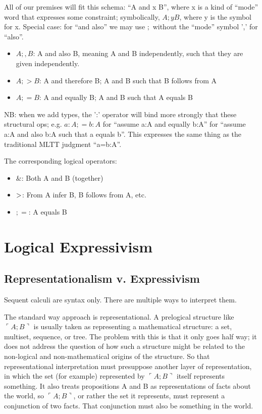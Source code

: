 \documentclass{article}
\begin{document}
All of our premises will fit this schema: ``A and x B'', where x is a
kind of ``mode'' word that expresses some constraint; symbolically,
\(A ;y B\), where y is the symbol for x. Special case: for ``and
also'' we may use \(;\) without the ``mode'' symbol ',' for ``also''.

\begin{itemize}
\item \(A ;, B\): A and also B, meaning A and B independently, such that they are given independently.
\item \(A ;> B\): A and therefore B; A and B such that B follows from A
\item \(A ;= B\): A and equally B; A and B such that A equals B
\end{itemize}

NB: when we add types, the ':' operator will bind more strongly that
these structural ops; e.g. \(a:A ;= b:A\) for ``assume a:A and equally
b:A'' for ``assume a:A and also b:A such that a equals b''. This
expresses the same thing as the traditional MLTT judgment ``a=b:A''.

The corresponding logical operators:

\begin{itemize}
\item \(\&\): Both A and B (together)
\item \(\->\): From A infer B, B follows from A, etc.
\item \(;=\): A equals B
\end{itemize}

\section{Logical Expressivism}

\subsection{Representationalism v. Expressivism}

Sequent calculi are syntax only. There are multiple ways to interpret
them.

The standard way approach is representational. A prelogical structure
like \(\ulcorner A ; B\urcorner\) is usually taken as representing a
mathematical structure: a set, multiset, sequence, or tree. The
problem with this is that it only goes half way; it does not address
the question of how such a structure might be related to the
non-logical and non-mathematical origins of the structure. So that
representational interpretation must presuppose another layer of
representation, in which the set (for example) represented by
\(\ulcorner A ; B\urcorner\) itself represents something. It also
treats propositions A and B as representations of facts about the
world, so \(\ulcorner A ; B\urcorner\), or rather the set it
represents, must represent a conjunction of two facts. That
conjunction must also be something in the world.
\end{document}
